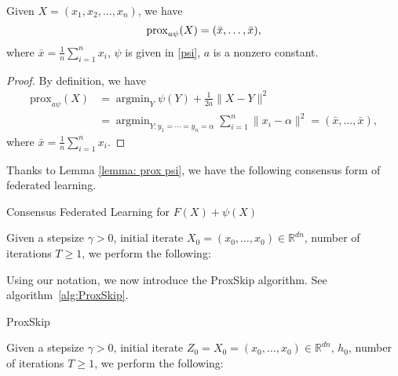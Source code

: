 \begin{itemize}
\begin{lemma}\label{lemma: prox psi}
Given $X = (x_1, x_2, \dots, x_n)$, we have 
\begin{equation}
    {\rm prox}_{a\psi}(X) = (\bar{x},\dots, \bar{x} ),
\end{equation}
where $\bar{x} =\frac{1}{n} \sum_{i = 1}^n x_i$, $\psi$ is given in \eqref{psi}, $a$ is a nonzero constant. 
\end{lemma}
\begin{proof}
By definition, we have 
\begin{equation*}
\begin{split}
        \text{prox}_{a\psi} (X) &= \mathop{\arg \min}_{Y} \psi(Y) + \frac{1}{2a} \| X - Y \|^2 \\
         & = \mathop{\arg \min}_{Y : y_1 = \cdots =y_n = \alpha } \sum_{i = 1}^n \| x_i - \alpha\|^2 = (\bar{x},\dots , \bar{x}),
\end{split}
\end{equation*}
where $\bar{x} =\frac{1}{n}\sum_{i=1}^n x_i$. 
\end{proof}

Thanks to Lemma \ref{lemma: prox psi}, we have the following consensus form of federated learning.

\begin{algorithm}
\caption{Consensus Federated Learning for $F(X) + \psi(X)$}\label{alg:FedLearing consensus}
Given a stepsize $\gamma > 0$, initial iterate $X_0 = (x_0, \dots, x_0) \in \mathbb{R}^{dn}$, number of iterations $T \geq 1$, we perform the following:  
\begin{algorithmic}
    \EndFor
\EndFor
\end{algorithmic}
\end{algorithm}

Using our notation, we now introduce the ProxSkip algorithm. See algorithm~\ref{alg:ProxSkip}. 

\begin{algorithm}
\caption{ProxSkip}\label{alg:ProxSkip}
Given a stepsize $\gamma > 0$, initial iterate $Z_0 = X_0 = (x_0, \dots, x_0) \in \mathbb{R}^{dn}$, $h_0$, number of iterations $T \geq 1$, we perform the following:  
\begin{algorithmic}
    \Else
    \EndIf 
\EndFor
\end{algorithmic}
\end{algorithm}


\end{itemize}
